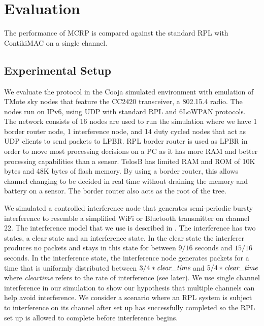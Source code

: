 \section{Evaluation}
\label{sec:evaluation}
The performance of MCRP is compared against the standard RPL with ContikiMAC on a single channel.

\subsection{Experimental Setup}
We evaluate the protocol in the  Cooja simulated environment with emulation of TMote sky nodes that feature the CC2420 transceiver, a 802.15.4 radio. The nodes run on IPv6, using UDP with standard RPL and 6LoWPAN protocols. The network consists of 16 nodes are used to run the simulation where we have 1 border router node, 1 interference node, and 14 duty cycled nodes that act as UDP clients to send packets to LPBR. RPL border router is used as LPBR in order to move most processing decisions on a PC as it has more RAM and better processing capabilities than a sensor. TelosB has limited RAM and ROM of 10K bytes and 48K bytes of flash memory. By using a border router, this allows channel changing to be decided in real time without draining the memory and battery on a sensor. The border router also acts as the root of the tree.

We simulated a controlled interference node that generates semi-periodic bursty interference to resemble a simplified WiFi or Bluetooth transmitter on channel 22. The interference model that we use is described in \cite{Boano:2010:MSM:2127940.2127963}. The interference has two states, a clear state and an interference state. In the clear state the interferer produces no packets and stays in this state for between $9/16$ seconds and $15/16$ seconds. In the interference state, the interference node generates packets for a time that is uniformly distributed between $3/4 * \emph{clear\textunderscore time}$ and $5/4 * \emph{clear\textunderscore time}$ where \emph{clear\textunderscore time} refers to the rate of interference (see later). We use single channel interference in our simulation to show our hypothesis that multiple channels can help avoid interference.  We consider a scenario where an RPL system is subject to interference on its channel after set up has successfully completed so the RPL set up is allowed to complete before
interference begins.



